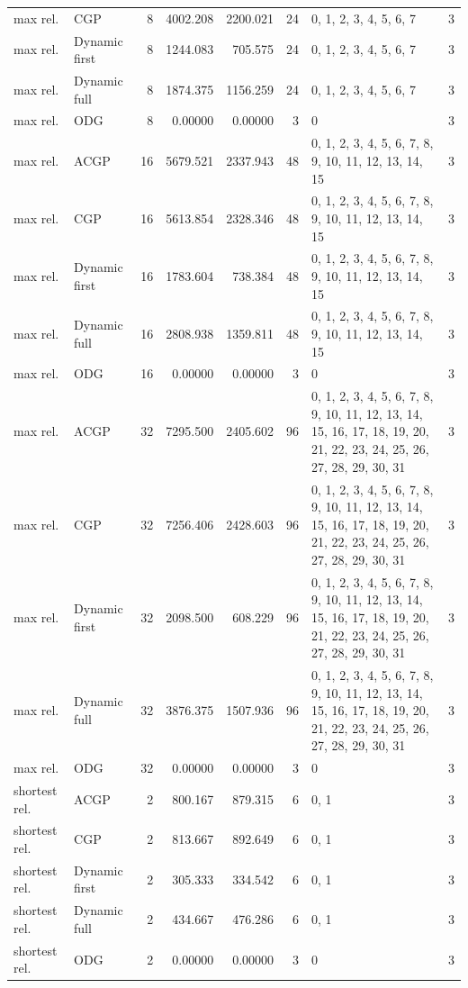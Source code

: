 \documentclass[10pt,a4paper]{article}
\begin{document}
\begin{longtable}{@{}p{23mm}p{29mm}rrrrp{36mm}r@{}}
max rel. & CGP & 8 & 4002.208 & 2200.021 & 24 & 0, 1, 2, 3, 4, 5, 6, 7 & 3 \\
max rel. & Dynamic first & 8 & 1244.083 & 705.575 & 24 & 0, 1, 2, 3, 4, 5, 6, 7 & 3 \\
max rel. & Dynamic full & 8 & 1874.375 & 1156.259 & 24 & 0, 1, 2, 3, 4, 5, 6, 7 & 3 \\
max rel. & ODG & 8 & 0.00000 & 0.00000 & 3 & 0 & 3 \\
max rel. & ACGP & 16 & 5679.521 & 2337.943 & 48 & 0, 1, 2, 3, 4, 5, 6, 7, 8, 9, 10, 11, 12, 13, 14, 15 & 3 \\
max rel. & CGP & 16 & 5613.854 & 2328.346 & 48 & 0, 1, 2, 3, 4, 5, 6, 7, 8, 9, 10, 11, 12, 13, 14, 15 & 3 \\
max rel. & Dynamic first & 16 & 1783.604 & 738.384 & 48 & 0, 1, 2, 3, 4, 5, 6, 7, 8, 9, 10, 11, 12, 13, 14, 15 & 3 \\
max rel. & Dynamic full & 16 & 2808.938 & 1359.811 & 48 & 0, 1, 2, 3, 4, 5, 6, 7, 8, 9, 10, 11, 12, 13, 14, 15 & 3 \\
max rel. & ODG & 16 & 0.00000 & 0.00000 & 3 & 0 & 3 \\
max rel. & ACGP & 32 & 7295.500 & 2405.602 & 96 & 0, 1, 2, 3, 4, 5, 6, 7, 8, 9, 10, 11, 12, 13, 14, 15, 16, 17, 18, 19, 20, 21, 22, 23, 24, 25, 26, 27, 28, 29, 30, 31 & 3 \\
max rel. & CGP & 32 & 7256.406 & 2428.603 & 96 & 0, 1, 2, 3, 4, 5, 6, 7, 8, 9, 10, 11, 12, 13, 14, 15, 16, 17, 18, 19, 20, 21, 22, 23, 24, 25, 26, 27, 28, 29, 30, 31 & 3 \\
max rel. & Dynamic first & 32 & 2098.500 & 608.229 & 96 & 0, 1, 2, 3, 4, 5, 6, 7, 8, 9, 10, 11, 12, 13, 14, 15, 16, 17, 18, 19, 20, 21, 22, 23, 24, 25, 26, 27, 28, 29, 30, 31 & 3 \\
max rel. & Dynamic full & 32 & 3876.375 & 1507.936 & 96 & 0, 1, 2, 3, 4, 5, 6, 7, 8, 9, 10, 11, 12, 13, 14, 15, 16, 17, 18, 19, 20, 21, 22, 23, 24, 25, 26, 27, 28, 29, 30, 31 & 3 \\
max rel. & ODG & 32 & 0.00000 & 0.00000 & 3 & 0 & 3 \\
shortest rel. & ACGP & 2 & 800.167 & 879.315 & 6 & 0, 1 & 3 \\
shortest rel. & CGP & 2 & 813.667 & 892.649 & 6 & 0, 1 & 3 \\
shortest rel. & Dynamic first & 2 & 305.333 & 334.542 & 6 & 0, 1 & 3 \\
shortest rel. & Dynamic full & 2 & 434.667 & 476.286 & 6 & 0, 1 & 3 \\
shortest rel. & ODG & 2 & 0.00000 & 0.00000 & 3 & 0 & 3 \\

\end{longtable}
\end{document}
